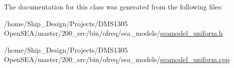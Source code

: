 The documentation for this class was generated from the following files\-:\begin{DoxyCompactItemize}
\item 
/home/\-Ship\-\_\-\-Design/\-Projects/\-D\-M\-S1305 Open\-S\-E\-A/master/200\-\_\-src/bin/ofreq/sea\-\_\-models/\hyperlink{seamodel__uniform_8h}{seamodel\-\_\-uniform.\-h}\item 
/home/\-Ship\-\_\-\-Design/\-Projects/\-D\-M\-S1305 Open\-S\-E\-A/master/200\-\_\-src/bin/ofreq/sea\-\_\-models/\hyperlink{seamodel__uniform_8cpp}{seamodel\-\_\-uniform.\-cpp}\end{DoxyCompactItemize}
